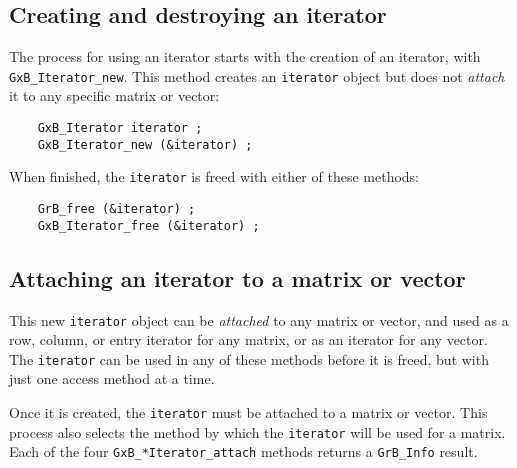 \documentclass[12pt]{article}
\begin{document}
\subsection{Creating and destroying an iterator}

The process for using an iterator starts with the creation of an iterator, with
\verb'GxB_Iterator_new'.  This method creates an \verb'iterator' object but
does not {\em attach} it to any specific matrix or vector:

    {\footnotesize
    \begin{verbatim}
    GxB_Iterator iterator ;
    GxB_Iterator_new (&iterator) ; \end{verbatim}}

When finished, the \verb'iterator' is freed with either of these methods:

    {\footnotesize
    \begin{verbatim}
    GrB_free (&iterator) ;
    GxB_Iterator_free (&iterator) ; \end{verbatim}}

\subsection{Attaching an iterator to a matrix or vector}

This new \verb'iterator' object can be {\em attached} to any matrix or vector,
and used as a row, column, or entry iterator for any matrix, or as an iterator
for any vector.  The \verb'iterator' can be used in any of these methods before
it is freed, but with just one access method at a time.

Once it is created, the \verb'iterator' must be attached to a matrix or
vector.  This process also selects the method by which the \verb'iterator'
will be used for a matrix.  Each of the four \verb'GxB_*Iterator_attach'
methods returns a \verb'GrB_Info' result.
\end{document}
